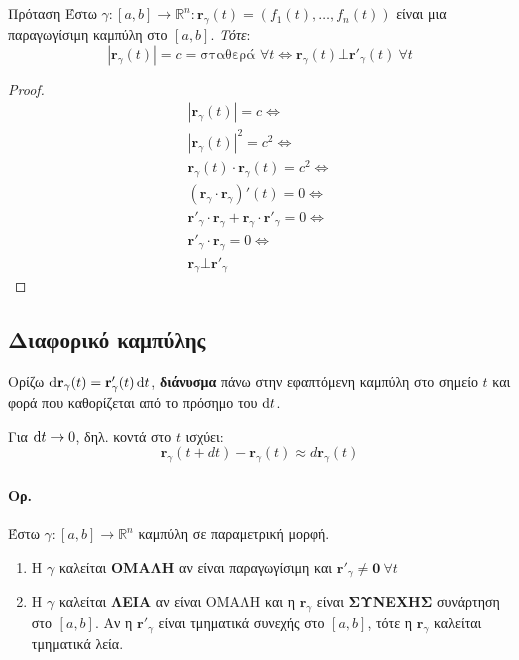 \documentclass[11pt,a4paper,titlepage,draft]{article}
\begin{document}
\subsection{}
\begin{infobox}{Πρόταση}
Έστω \( \gamma: [a,b] \rightarrow \mathbb R^n: \mathbf r_\gamma (t) = \left( f_1(t),\dots,f_n(t) \right) \) είναι μια παραγωγίσιμη καμπύλη στο \( [a,b] \). \emph{Τότε}:
\[ \left| \mathbf r_\gamma (t) \right| = c = \text{σταθερά } \forall t \iff
\mathbf r_\gamma (t) \bot \mathbf r'_\gamma (t) \ \forall t \]
\tcblower
\begin{proof}
\begin{align*}
|\mathbf r_\gamma(t)| = c \iff \\
|\mathbf r_\gamma(t)|^2 = c^2 \iff \\
\mathbf r_\gamma (t) \cdot \mathbf r_\gamma (t) = c^2 \iff \\
(\mathbf r_\gamma \cdot \mathbf r_\gamma)'(t) = 0 \iff \\
\mathbf r'_\gamma \cdot \mathbf r_\gamma + \mathbf r_\gamma \cdot \mathbf r'_\gamma = 0
\iff \\
\mathbf r'_\gamma \cdot \mathbf r_\gamma = 0 \iff \\
\mathbf r_\gamma \bot \mathbf r'_\gamma
\end{align*}
\end{proof}
\end{infobox}

\subsection{Διαφορικό καμπύλης}
Ορίζω \(\dif   \mathbf r _ \gamma (t) = \mathbf r '_ \gamma (t) \dif t\), \textbf{διάνυσμα} πάνω στην εφαπτόμενη καμπύλη στο σημείο \(t\) και φορά που καθορίζεται από το πρόσημο του \(\dif t\).


Για \(\dif t \to 0\), δηλ. κοντά στο \(t\) ισχύει:
\[ \mathbf r _\gamma (t+dt) - \mathbf r _\gamma (t) \approx d\mathbf r_\gamma (t) \]





\subsubsection{}
\paragraph{Ορ.}
Έστω \(\gamma: [a,b] \to \mathbb R ^n\) καμπύλη σε παραμετρική μορφή.
\begin{enumerate}
\item Η \(\gamma\) καλείται \textbf{ΟΜΑΛΗ} αν είναι παραγωγίσιμη και \( \mathbf r' _ \gamma \neq \mathbf 0 \ \forall t \)
\item Η \( \gamma \) καλείται \textbf{ΛΕΙΑ} αν είναι ΟΜΑΛΗ και η \( \mathbf r _ \gamma \) είναι \textbf{ΣΥΝΕΧΗΣ} συνάρτηση στο \([a,b]\). Αν η \( \mathbf r '_ \gamma \) είναι τμηματικά συνεχής στο \([a,b]\), τότε η \( \mathbf r _ \gamma \) καλείται τμηματικά λεία.
\end{enumerate}
\end{document}
